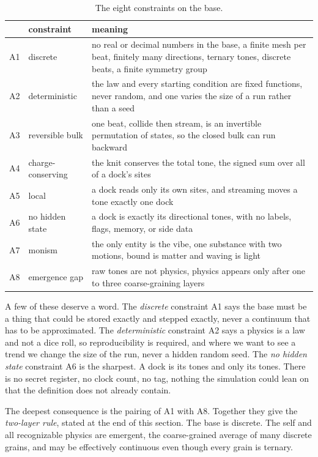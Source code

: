 \begin{table}[ht]
\centering
\begin{tabular}{@{}llp{}@{}}
\toprule
& constraint & meaning \\
\midrule
A1 & discrete & no real or decimal numbers in the base, a finite mesh per beat, finitely many directions, ternary tones, discrete beats, a finite symmetry group \\
A2 & deterministic & the law and every starting condition are fixed functions, never random, and one varies the size of a run rather than a seed \\
A3 & reversible bulk & one beat, collide then stream, is an invertible permutation of states, so the closed bulk can run backward \\
A4 & charge-conserving & the knit conserves the total tone, the signed sum over all of a dock's sites \\
A5 & local & a dock reads only its own sites, and streaming moves a tone exactly one dock \\
A6 & no hidden state & a dock is exactly its directional tones, with no labels, flags, memory, or side data \\
A7 & monism & the only entity is the vibe, one substance with two motions, bound is matter and waving is light \\
A8 & emergence gap & raw tones are not physics, physics appears only after one to three coarse-graining layers \\
\bottomrule
\end{tabular}
\caption{The eight constraints on the base.}
\label{tab:base-axioms}
\end{table}

A few of these deserve a word. The \emph{discrete} constraint A1 says the base must be a thing that could be stored exactly and stepped exactly, never a continuum that has to be approximated. The \emph{deterministic} constraint A2 says a physics is a law and not a dice roll, so reproducibility is required, and where we want to see a trend we change the size of the run, never a hidden random seed. The \emph{no hidden state} constraint A6 is the sharpest. A dock is its tones and only its tones. There is no secret register, no clock count, no tag, nothing the simulation could lean on that the definition does not already contain.

The deepest consequence is the pairing of A1 with A8. Together they give the \emph{two-layer rule}, stated at the end of this section. The base is discrete. The self and all recognizable physics are emergent, the coarse-grained average of many discrete grains, and may be effectively continuous even though every grain is ternary.


